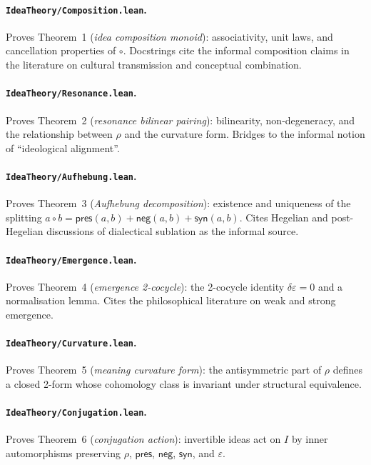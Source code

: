 \documentclass[11pt,oneside]{book}
\begin{document}
\paragraph{\texttt{IdeaTheory/Composition.lean}.}
Proves Theorem~1 (\emph{idea composition monoid}): associativity, unit
laws, and cancellation properties of $\circ$. Docstrings cite the
informal composition claims in the literature on cultural transmission
and conceptual combination.

\paragraph{\texttt{IdeaTheory/Resonance.lean}.}
Proves Theorem~2 (\emph{resonance bilinear pairing}): bilinearity,
non-degeneracy, and the relationship between $\rho$ and the curvature
form. Bridges to the informal notion of ``ideological alignment''.

\paragraph{\texttt{IdeaTheory/Aufhebung.lean}.}
Proves Theorem~3 (\emph{Aufhebung decomposition}): existence and
uniqueness of the splitting
$a\circ b = \mathsf{pres}(a,b)+\mathsf{neg}(a,b)+\mathsf{syn}(a,b)$.
Cites Hegelian and post-Hegelian discussions of dialectical
sublation as the informal source.

\paragraph{\texttt{IdeaTheory/Emergence.lean}.}
Proves Theorem~4 (\emph{emergence 2-cocycle}): the 2-cocycle identity
$\delta\varepsilon = 0$ and a normalisation lemma. Cites the
philosophical literature on weak and strong emergence.

\paragraph{\texttt{IdeaTheory/Curvature.lean}.}
Proves Theorem~5 (\emph{meaning curvature form}): the antisymmetric
part of $\rho$ defines a closed 2-form whose cohomology class is
invariant under structural equivalence.

\paragraph{\texttt{IdeaTheory/Conjugation.lean}.}
Proves Theorem~6 (\emph{conjugation action}): invertible ideas act on
$I$ by inner automorphisms preserving $\rho$, $\mathsf{pres}$,
$\mathsf{neg}$, $\mathsf{syn}$, and $\varepsilon$.
\end{document}

